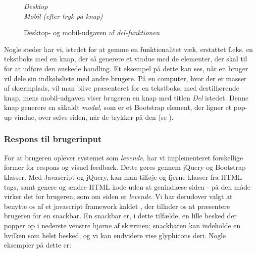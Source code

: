 \begin{figure}
\vspace{-30pt}
\begin{center}
\textit{Desktop}
\\
\vspace{10pt}
\textit{Mobil (efter tryk på knap)}
\end{center}
\vspace{-10pt}
\caption{Desktop- og mobil-udgaven af \textit{del-funktionen}}\label{ss:share_diffs}
\vspace{-30pt}
\end{figure}
Nogle steder har vi, istedet for at gemme en funktionalitet væk, erstattet f.eks. en tekstboks med en knap, der så generere et vindue med de elementer, der skal til for at udføre den ønskede handling. 
Et eksempel på dette kan ses, når en bruger vil dele sin indkøbsliste med andre brugere.
På en computer, hvor der er masser af skærmplads, vil man blive præsenteret for en tekstboks, med dertilhørende knap, mens mobil-udgaven viser brugeren en knap med titlen \textit{Del} istedet.
Denne knap generere en såkaldt \textit{modal}, som er et Bootstrap element, der ligner et pop-up vindue, over selve siden, når de trykker på den (se ).

\subsubsection{Respons til brugerinput}
For at brugeren oplever systemet som \textit{levende}, har vi implementeret forskellige former for respons og visuel feedback.
Dette gøres gennem jQuery og Bootstrap klasser.
Med Javascript og jQuery, kan man tilføje og fjerne klasser fra HTML tags, samt genere og ændre HTML kode uden at genindlæse siden - på den måde virker det for brugeren, som om siden er \textit{levende}.
Vi har derudover valgt at benytte os af et javascript framework kaldet , der tillader os at præsentere brugeren for en snackbar.
En snackbar er, i dette tilfælde, en lille besked der popper op i nederste venstre hjørne af skærmen; snackbaren kan indeholde en hvilken som helst besked, og vi kan endvidere vise glyphicons deri.
Nogle eksempler på dette er:

